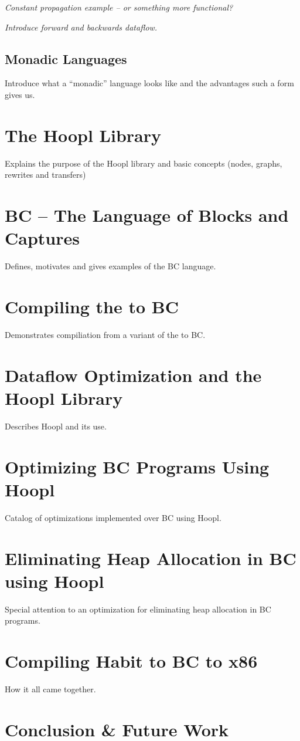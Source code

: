 \documentclass[11pt]{article}
\begin{document}
\emph{Constant propagation example -- or something more functional?}

\emph{Introduce forward and backwards dataflow.}




\subsection{Monadic Languages}

Introduce what a ``monadic'' language looks like and the advantages such a form
gives us.

\section{The Hoopl Library}

Explains the purpose of the Hoopl library and basic concepts (nodes,
graphs, rewrites and transfers)

\section{BC -- The Language of Blocks and Captures}

Defines, motivates and gives examples of the BC language.

\section{Compiling the \lamA to BC}

Demonstrates compiliation from a variant of the \lamA to BC. 

\section{Dataflow Optimization and the Hoopl Library}

Describes Hoopl and its use.

\section{Optimizing BC Programs Using Hoopl}

Catalog of optimizations implemented over BC using Hoopl.

\section{Eliminating Heap Allocation in BC using Hoopl}

Special attention to an optimization for eliminating heap allocation
in BC programs.

\section{Compiling Habit to BC to x86}

How it all came together.

\section{Conclusion \& Future Work}
\end{document}
